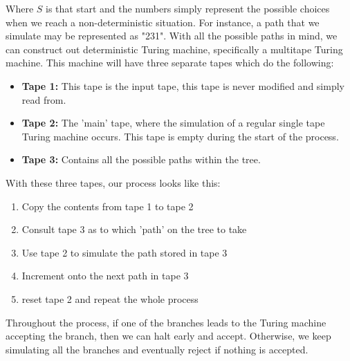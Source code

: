\documentclass[12pt, letterpaper]{article}
\begin{document}
\begin{center}
\end{center}

Where $S$ is that start and the numbers simply represent the possible choices when we reach a non-deterministic situation. For instance, a path that we simulate may be represented as "231". With all the possible paths in mind, we can construct out deterministic Turing machine, specifically a multitape Turing machine. This machine will have three separate tapes which do the following:
\begin{itemize}
\item \textbf{Tape 1:} This tape is the input tape, this tape is never modified and simply read from.
\item \textbf{Tape 2:} The 'main' tape, where the simulation of a regular single tape Turing machine occurs. This tape is empty during the start of the process.
\item \textbf{Tape 3:} Contains all the possible paths within the tree.
\end{itemize}
With these three tapes, our process looks like this:
\begin{enumerate}
\item Copy the contents from tape 1 to tape 2
\item Consult tape 3 as to which 'path' on the tree to take
\item Use tape 2 to simulate the path stored in tape 3
\item Increment onto the next path in tape 3
\item reset tape 2 and repeat the whole process
\end{enumerate}
Throughout the process, if one of the branches leads to the Turing machine accepting the branch, then we can halt early and accept. Otherwise, we keep simulating all the branches and eventually reject if nothing is accepted.
\end{document}
